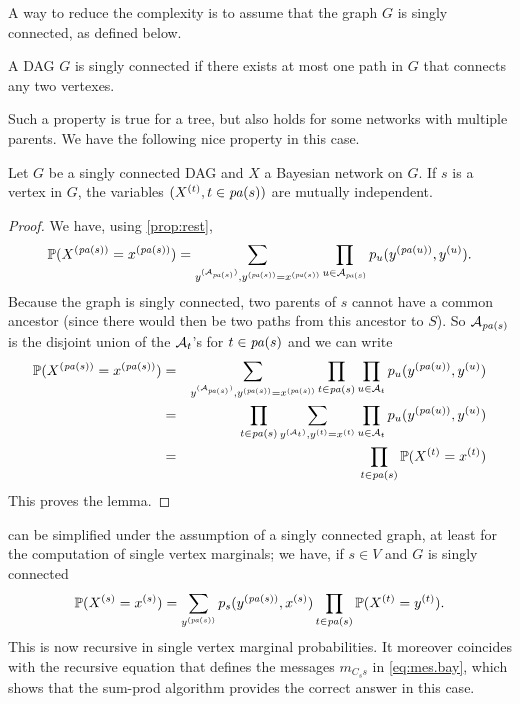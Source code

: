 A way to reduce the complexity is to assume that the graph $G$ is
singly connected, as defined below.

\begin{definition}
\label{def:sin.com}
A DAG $G$ is singly connected if there exists at most one path in $G$ that connects
any two vertexes. 
\end{definition}
Such a property is true for a tree, but also
holds for some networks with multiple parents. We have the
following nice property in this case.

\begin{proposition}
\label{prop:sin.con}
Let $G$ be a singly connected DAG and $X$ a Bayesian network on
$G$. If $s$ is a vertex in $G$, the variables $(X^{(t)}, t\in {\mathit{pa}(s)})$ are
mutually independent.
\end{proposition}
\begin{proof}
We have, using  \cref{prop:rest},
$$
\bm{\mathbb P}(X^{({\mathit{pa}(s)})} = x^{({\mathit{pa}(s)})})  = \sum_{y^{({\mathcal A}_{{\mathit{pa}(s)}})}, y^{({\mathit{pa}(s)})} = x^{({\mathit{pa}(s)})}}
\prod_{u\in {\mathcal A}_{{\mathit{pa}(s)}}} p_u(y^{({\mathit{pa}(u)})}, y^{(u)}).
$$
Because the graph is singly connected, two parents of $s$ cannot have a
common ancestor (since there would then be two paths from this
ancestor to 
$S$). So ${\mathcal A}_{{\mathit{pa}(s)}}$ is the disjoint union of the ${\mathcal A}_{t}$'s for $t\in
{\mathit{pa}(s)}$ and we can write
\begin{eqnarray*}
\bm{\mathbb P}(X^{({\mathit{pa}(s)})} = x^{({\mathit{pa}(s)})})  &=& \sum_{y^{({\mathcal A}_{{\mathit{pa}(s)}})}, y^{({\mathit{pa}(s)})} = x^{({\mathit{pa}(s)})}}
 \prod_{t\in {\mathit{pa}(s)}}  \prod_{u\in{\mathcal A}_t} p_u(y^{({\mathit{pa}(u)})}, y^{(u)})\\
&=& \prod_{t\in {\mathit{pa}(s)}} \sum_{y^{({\mathcal A}_{t})}, y^{(t)} = x^{(t)}}
   \prod_{u\in{\mathcal A}_t} p_u(y^{({\mathit{pa}(u)})}, y^{(u)})\\
&=& \prod_{t\in {\mathit{pa}(s)}} \bm{\mathbb P}(X^{(t)} = x^{(t)})
\end{eqnarray*}
This proves the lemma.
\end{proof}

  can be simplified under the assumption of
a singly connected graph, at least for the computation of single
vertex marginals; we have, if $s\in V$ and $G$ is singly connected
\begin{equation}
\label{eq:sing.con}
\bm{\mathbb P}(X^{(s)} = x^{(s)}) = \sum_{y^{({\mathit{pa}(s)})}}  p_s(y^{({\mathit{pa}(s)})}, x^{(s)}) \prod_{t\in {\mathit{pa}(s)}}
\bm{\mathbb P}(X^{(t)} = y^{(t)}).
\end{equation}
This is now recursive in single vertex marginal probabilities. It
moreover coincides with the recursive equation that defines the
messages $m_{C_ss}$ in \cref{eq:mes.bay}, which shows that the
sum-prod algorithm provides the correct answer in this case.

